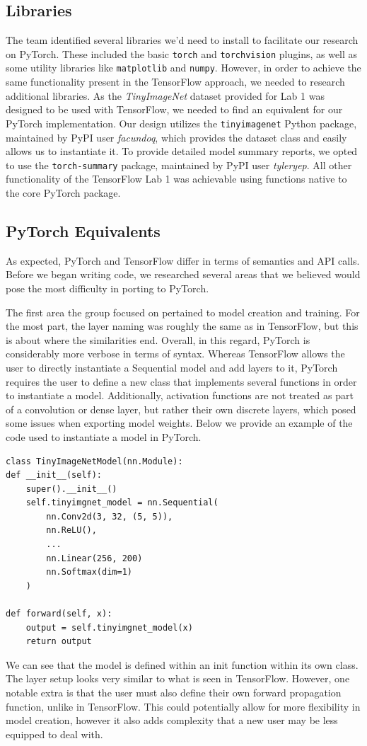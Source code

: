 \documentclass[letterpaper,twocolumn,10pt]{article}
\begin{document}
\subsection{Libraries}
The team identified several libraries we'd need to install to facilitate our research on PyTorch. These included the basic \verb|torch| and \verb|torchvision| plugins, as well as some utility libraries like \verb|matplotlib| and \verb|numpy|. However, in order to achieve the same functionality present in the TensorFlow approach, we needed to research additional libraries. As the \textit{TinyImageNet} dataset provided for Lab 1 was designed to be used with TensorFlow, we needed to find an equivalent for our PyTorch implementation. Our design utilizes the \verb|tinyimagenet| Python package, maintained by PyPI user \textit{facundoq}, which provides the dataset class and easily allows us to instantiate it. To provide detailed model summary reports, we opted to use the \verb|torch-summary| package, maintained by PyPI user \textit{tyleryep}. All other functionality of the TensorFlow Lab 1 was achievable using functions native to the core PyTorch package.

\subsection{PyTorch Equivalents}
As expected, PyTorch and TensorFlow differ in terms of semantics and API calls. Before we began writing code, we researched several areas that we believed would pose the most difficulty in porting to PyTorch.

The first area the group focused on pertained to model creation and training. For the most part, the layer naming was roughly the same as in TensorFlow, but this is about where the similarities end. Overall, in this regard, PyTorch is considerably more verbose in terms of syntax. Whereas TensorFlow allows the user to directly instantiate a Sequential model and add layers to it, PyTorch requires the user to define a new class that implements several functions in order to instantiate a model. Additionally, activation functions are not treated as part of a convolution or dense layer, but rather their own discrete layers, which posed some issues when exporting model weights. Below we provide an example of the code used to instantiate a model in PyTorch.
\begin{verbatim}
class TinyImageNetModel(nn.Module):
def __init__(self):
    super().__init__()
    self.tinyimgnet_model = nn.Sequential(
        nn.Conv2d(3, 32, (5, 5)),
        nn.ReLU(),
        ...
        nn.Linear(256, 200)
        nn.Softmax(dim=1)
    )

def forward(self, x):
    output = self.tinyimgnet_model(x)
    return output
\end{verbatim}
We can see that the model is defined within an init function within its own class. The layer setup looks very similar to what is seen in TensorFlow. However, one notable extra is that the user must also define their own forward propagation function, unlike in TensorFlow. This could potentially allow for more flexibility in model creation, however it also adds complexity that a new user may be less equipped to deal with.
\end{document}
